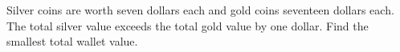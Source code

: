 Silver coins are worth seven dollars each and gold coins seventeen dollars each. The total silver value exceeds the total gold value by one dollar. Find the smallest total wallet value.
